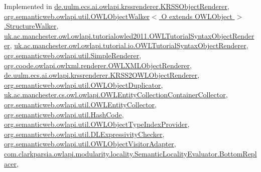 Implemented in \hyperlink{classde_1_1uulm_1_1ecs_1_1ai_1_1owlapi_1_1krssrenderer_1_1_k_r_s_s_object_renderer_aaf464c32e92ab7d6ed4d3c671e7eccc8}{de.\-uulm.\-ecs.\-ai.\-owlapi.\-krssrenderer.\-K\-R\-S\-S\-Object\-Renderer}, \hyperlink{classorg_1_1semanticweb_1_1owlapi_1_1util_1_1_o_w_l_object_walker_3_01_o_01extends_01_o_w_l_object_01_4_1_1_structure_walker_a243636c6eac3c4e416198a3f55cdf7af}{org.\-semanticweb.\-owlapi.\-util.\-O\-W\-L\-Object\-Walker$<$ O extends O\-W\-L\-Object $>$.\-Structure\-Walker}, \hyperlink{classuk_1_1ac_1_1manchester_1_1owl_1_1owlapi_1_1tutorialowled2011_1_1_o_w_l_tutorial_syntax_object_renderer_a3dd71e6d4842f73f535cebda5c703e0c}{uk.\-ac.\-manchester.\-owl.\-owlapi.\-tutorialowled2011.\-O\-W\-L\-Tutorial\-Syntax\-Object\-Renderer}, \hyperlink{classuk_1_1ac_1_1manchester_1_1owl_1_1owlapi_1_1tutorial_1_1io_1_1_o_w_l_tutorial_syntax_object_renderer_ae67e81ed142525fe114478b914799bbd}{uk.\-ac.\-manchester.\-owl.\-owlapi.\-tutorial.\-io.\-O\-W\-L\-Tutorial\-Syntax\-Object\-Renderer}, \hyperlink{classorg_1_1semanticweb_1_1owlapi_1_1util_1_1_simple_renderer_acfce70d27a70a9ea59dd42432c49cc01}{org.\-semanticweb.\-owlapi.\-util.\-Simple\-Renderer}, \hyperlink{classorg_1_1coode_1_1owlapi_1_1owlxml_1_1renderer_1_1_o_w_l_x_m_l_object_renderer_adaeea4ee5aad5d3a01dfbbc6fefd6a16}{org.\-coode.\-owlapi.\-owlxml.\-renderer.\-O\-W\-L\-X\-M\-L\-Object\-Renderer}, \hyperlink{classde_1_1uulm_1_1ecs_1_1ai_1_1owlapi_1_1krssrenderer_1_1_k_r_s_s2_o_w_l_object_renderer_a286337194029fb6d4f3fd8a4bb403b6c}{de.\-uulm.\-ecs.\-ai.\-owlapi.\-krssrenderer.\-K\-R\-S\-S2\-O\-W\-L\-Object\-Renderer}, \hyperlink{classorg_1_1semanticweb_1_1owlapi_1_1util_1_1_o_w_l_object_duplicator_a0447633890cb88dd95635624c4da54a9}{org.\-semanticweb.\-owlapi.\-util.\-O\-W\-L\-Object\-Duplicator}, \hyperlink{classuk_1_1ac_1_1manchester_1_1cs_1_1owl_1_1owlapi_1_1_o_w_l_entity_collection_container_collector_a318a740f5f2c8333760a40e8733de6e8}{uk.\-ac.\-manchester.\-cs.\-owl.\-owlapi.\-O\-W\-L\-Entity\-Collection\-Container\-Collector}, \hyperlink{classorg_1_1semanticweb_1_1owlapi_1_1util_1_1_o_w_l_entity_collector_ac4de48856620f05b818b7f7cd5e212dc}{org.\-semanticweb.\-owlapi.\-util.\-O\-W\-L\-Entity\-Collector}, \hyperlink{classorg_1_1semanticweb_1_1owlapi_1_1util_1_1_hash_code_a50fec18cfc0cee3966de7d61aee2f8d4}{org.\-semanticweb.\-owlapi.\-util.\-Hash\-Code}, \hyperlink{classorg_1_1semanticweb_1_1owlapi_1_1util_1_1_o_w_l_object_type_index_provider_ae2efffd6e887aea0b0671a2582b38bb3}{org.\-semanticweb.\-owlapi.\-util.\-O\-W\-L\-Object\-Type\-Index\-Provider}, \hyperlink{classorg_1_1semanticweb_1_1owlapi_1_1util_1_1_d_l_expressivity_checker_a4d0743043f7232e7a6dd7e88b2f26bce}{org.\-semanticweb.\-owlapi.\-util.\-D\-L\-Expressivity\-Checker}, \hyperlink{classorg_1_1semanticweb_1_1owlapi_1_1util_1_1_o_w_l_object_visitor_adapter_aed1f048300e4f0cd2c4f3cdd788a9c7a}{org.\-semanticweb.\-owlapi.\-util.\-O\-W\-L\-Object\-Visitor\-Adapter}, \hyperlink{classcom_1_1clarkparsia_1_1owlapi_1_1modularity_1_1locality_1_1_semantic_locality_evaluator_1_1_bottom_replacer_a5fe71d3e0d634c4864417e9f9d6fe085}{com.\-clarkparsia.\-owlapi.\-modularity.\-locality.\-Semantic\-Locality\-Evaluator.\-Bottom\-Replacer}, 